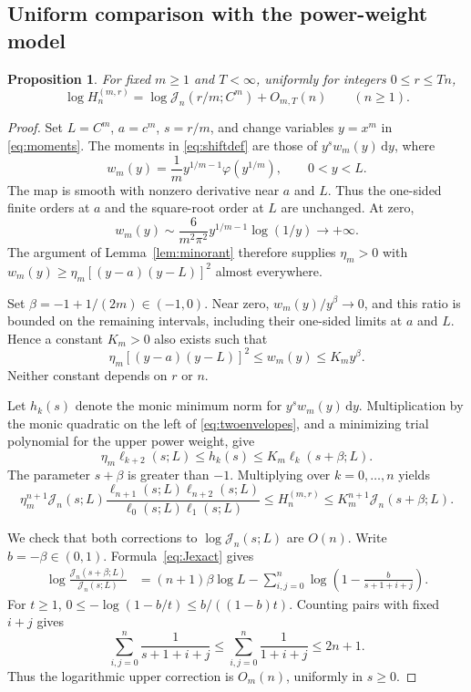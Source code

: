 \documentclass[11pt,a4paper]{article}
\numberwithin{equation}{section}
\newtheorem{proposition}[theorem]{Proposition}
\theoremstyle{remark}\newtheorem{remark}[theorem]{Remark}
\newcommand{\J}{\mathcal J}
\newcommand{\dd}{\,\mathrm d}
\begin{document}
\subsection{Uniform comparison with the power-weight model}
\begin{proposition}\label{prop:comparison}
For fixed $m\geq1$ and $T<\infty$, uniformly for integers $0\leq r\leq Tn$,
\begin{equation}\label{eq:modelcomparison}
 \log H_n^{(m,r)}=\log\J_n(r/m;C^m)+O_{m,T}(n)
 \qquad(n\geq1).
\end{equation}
\end{proposition}
\begin{proof}
Set $L=C^m$, $a=c^m$, $s=r/m$, and change variables $y=x^m$ in
\eqref{eq:moments}. The moments in \eqref{eq:shiftdef} are those of
$y^s w_m(y)\dd y$, where
\begin{equation}\label{eq:pushforward}
 w_m(y)=\frac1m y^{1/m-1}\varphi(y^{1/m}),\qquad0<y<L.
\end{equation}
The map is smooth with nonzero derivative near $a$ and $L$. Thus the
one-sided finite orders at $a$ and the square-root order at $L$ are unchanged.
At zero,
\[
 w_m(y)\sim\frac6{m^2\pi^2}y^{1/m-1}\log(1/y)\longrightarrow+\infty.
\]
The argument of Lemma~\ref{lem:minorant} therefore supplies $\eta_m>0$ with
$w_m(y)\geq\eta_m[(y-a)(y-L)]^2$ almost everywhere.

Set $\beta=-1+1/(2m)\in(-1,0)$. Near zero,
$w_m(y)/y^\beta\to0$, and this ratio is bounded on the remaining intervals,
including their one-sided limits at $a$ and $L$. Hence a constant $K_m>0$
also exists such that
\begin{equation}\label{eq:twoenvelopes}
 \eta_m[(y-a)(y-L)]^2\leq w_m(y)\leq K_m y^\beta.
\end{equation}
Neither constant depends on $r$ or $n$.

Let $h_k(s)$ denote the monic minimum norm for $y^s w_m(y)\dd y$.
Multiplication by the monic quadratic on the left of
\eqref{eq:twoenvelopes}, and a minimizing trial polynomial for the upper
power weight, give
\[
 \eta_m\ell_{k+2}(s;L)\leq h_k(s)\leq K_m\ell_k(s+\beta;L).
\]
The parameter $s+\beta$ is greater than $-1$. Multiplying over $k=0,\ldots,n$
yields
\begin{equation}\label{eq:modelbounds}
 \eta_m^{n+1}\J_n(s;L)
 \frac{\ell_{n+1}(s;L)\ell_{n+2}(s;L)}{\ell_0(s;L)\ell_1(s;L)}
 \leq H_n^{(m,r)}\leq K_m^{n+1}\J_n(s+\beta;L).
\end{equation}

We check that both corrections to $\log\J_n(s;L)$ are $O(n)$.
Write $b=-\beta\in(0,1)$. Formula~\eqref{eq:Jexact} gives
\begin{align*}
 \log\frac{\J_n(s+\beta;L)}{\J_n(s;L)}
 &=(n+1)\beta\log L
  -\sum_{i,j=0}^n\log\left(1-\frac b{s+1+i+j}\right).
\end{align*}
For $t\geq1$,
$0\leq-\log(1-b/t)\leq b/((1-b)t)$. Counting pairs with fixed $i+j$ gives
\[
 \sum_{i,j=0}^n\frac1{s+1+i+j}
 \leq\sum_{i,j=0}^n\frac1{1+i+j}\leq2n+1.
\]
Thus the logarithmic upper correction is $O_m(n)$, uniformly in $s\geq0$.


\end{proof}
\end{document}
